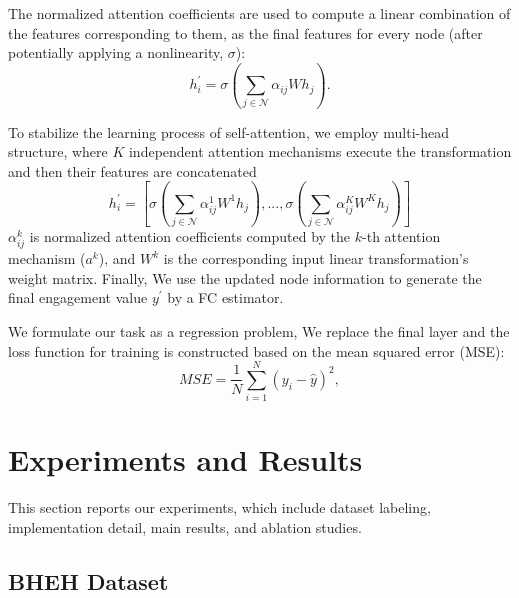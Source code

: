 \documentclass[twocolumn]{svjour3}
\begin{document}
The normalized attention coefficients are used to compute a linear combination of the features corresponding to them, as the final features for every node (after potentially applying a nonlinearity, $\sigma$):
\begin{equation}
  h_i^{\prime} = \sigma\left(\sum_{j \in \mathcal{N}} \alpha_{ij}Wh_j\right).
\end{equation}

To stabilize the learning process of self-attention, we employ multi-head structure, where $K$ independent attention mechanisms execute the transformation and then their features are concatenated
\begin{equation}
  h_i^{\prime} = \left[\sigma\left(\sum_{j \in \mathcal{N}} \alpha_{ij}^1W^1h_j\right),...,\sigma\left(\sum_{j \in \mathcal{N}} \alpha_{ij}^KW^Kh_j\right)\right]
\end{equation}
$\alpha_{ij}^k$ is normalized attention coefficients computed by the $k$-th attention mechanism ($a^k$), and $W^k$ is the corresponding input linear transformation's weight matrix. Finally, We use the updated node information to generate the final engagement value $y^{\prime}$ by a FC estimator.



We formulate our task as a regression problem, We replace the final layer and the loss function for training is constructed based on the mean squared error (MSE):
\begin{equation}
  MSE = \frac{1}{N}\sum_{i=1}^N(y_i-\hat{y})^2,
\end{equation}


\section{Experiments and Results}
\label{s:Experiments_and_Results}
This section reports our experiments, which include dataset labeling, implementation detail, main results, and ablation studies.

\subsection{BHEH Dataset}
\label{subs:BHEH_Dataset}
\end{document}
